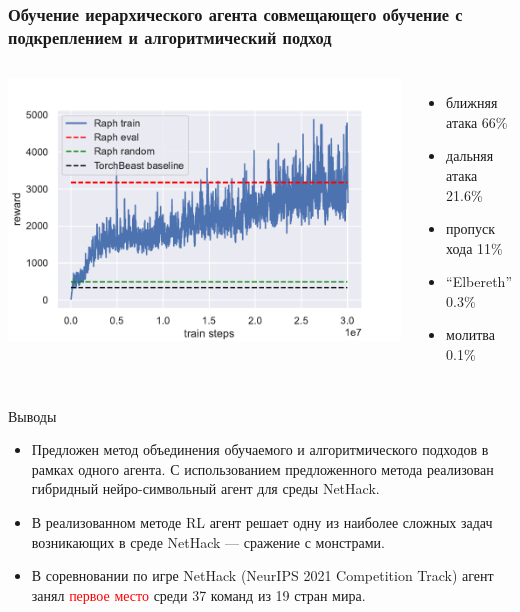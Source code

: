 \begin{frame}
\frametitle{Обучение иерархического агента совмещающего обучение с подкреплением и алгоритмический подход}
\begin{columns}
\centering
\includegraphics[width=1\linewidth]{images/raph_train.pdf}
\begin{itemize}
    \item ближняя атака 66\%
    \item дальняя атака 21.6\%
    \item пропуск хода 11\%
    \item ``Elbereth'' 0.3\%
    \item молитва 0.1\%
\end{itemize}
\end{columns}
\end{frame}


\begin{frame}{Выводы}
\begin{itemize}
    \item[\textcolor{ForestGreen}{\checkmark}] Предложен метод объединения обучаемого и алгоритмического подходов в рамках одного агента. С использованием предложенного метода реализован гибридный нейро-символьный агент для среды NetHack.
    \item[\textcolor{ForestGreen}{\checkmark}] В реализованном методе RL агент решает одну из наиболее сложных задач возникающих в среде NetHack — сражение с монстрами.
    \item[\textcolor{ForestGreen}{\checkmark}] В соревновании по игре NetHack (NeurIPS 2021 Competition Track) агент занял \textcolor{red}{первое место} среди 37 команд из 19 стран мира.
\end{itemize}
    
\end{frame}


